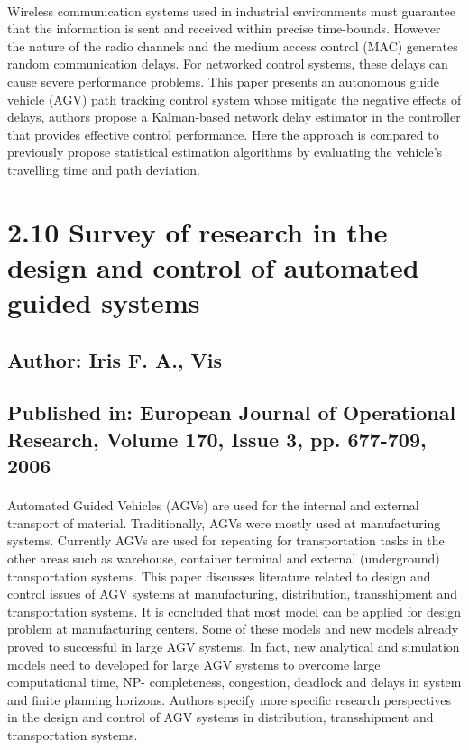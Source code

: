 \paragraph{}Wireless communication systems used in industrial environments must guarantee that the information is sent and received within precise time-bounds. However the nature of the radio channels and the medium access control (MAC) generates random communication delays. For networked control systems, these delays can cause severe performance problems. This paper presents an autonomous guide vehicle (AGV) path tracking control system whose mitigate the negative effects of delays, authors propose a Kalman-based network delay estimator in the controller that provides effective control performance. Here the approach is compared to previously propose statistical estimation algorithms by evaluating the vehicle’s travelling time and path deviation.

\section*{2.10 Survey of research in the design and control of automated guided systems\cite{Iris}}
\subsection*{Author: Iris F. A., Vis}
\subsection*{Published in: European Journal of Operational Research, Volume 170, Issue 3, pp. 677-709, 2006}
\paragraph{} Automated Guided Vehicles (AGVs) are used for the internal and external transport of material. Traditionally, AGVs were mostly used at manufacturing systems. Currently AGVs are used for repeating for transportation tasks in the other areas such as warehouse, container terminal and external (underground) transportation systems. This paper discusses literature related to design and control issues of AGV systems at manufacturing, distribution, transshipment and transportation systems. It is concluded that most model can be applied for design problem at manufacturing centers. Some of these models and new models already proved to successful in large AGV systems. In fact, new analytical and simulation models need to developed for large AGV systems to overcome large computational time, NP- completeness, congestion, deadlock and delays in system and finite planning horizons. Authors specify more specific research perspectives in the design and control of AGV systems in distribution, transshipment and transportation systems.
\newpage

